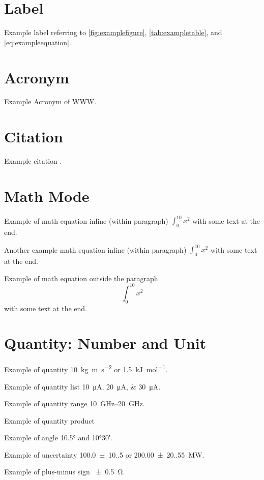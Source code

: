 \section{Label}

Example label referring to \autoref{fig:examplefigure}, \autoref{tab:exampletable}, and \autoref{eq:exampleequation}.

\section{Acronym}
Example Acronym of \ac{WWW}.

\section{Citation}

Example citation \cite{shannon1949communication}.

\section{Math Mode}


Example of math equation inline (within paragraph) $ \int_{0}^{10} x^2 $ with some text at the end.

Another example math equation inline (within paragraph) \( \int_{0}^{10} x^2 \) with some text at the end.

Example of math equation outside the paragraph \[ \int_{0}^{10} x^2 \] with some text at the end.

\section{Quantity: Number and Unit}

Example of quantity \qty{10}{\kg\m\per\s\squared} or \qty[per-mode=symbol]{1.5}{\kJ\per\mol}.

Example of quantity list \qtylist{10;20;30}{\uA}.

Example of quantity range \qtyrange{10}{20}{\GHz}.

Example of quantity product 

Example of angle \ang{10.5} and \ang{10;30}.

Example of uncertainty \qty{100.0(10.5)}{\nF} or \qty[separate-uncertainty-units = repeat]{200.00(20.55)}{\MW}.

Example of plus-minus sign \qty{\pm 0.5}{\ohm}.

